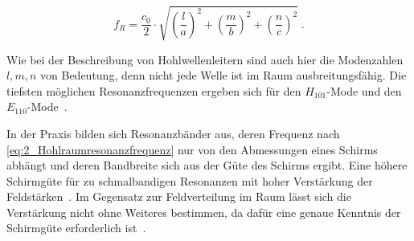 \begin{equation}
    f_R = \frac{c_0}{2}\cdot \sqrt{\left(\frac{l}{a}\right)^2+\left(\frac{m}{b}\right)^2+\left(\frac{n}{c}\right)^2} \; \text{.}
    \label{eq:2_Hohlraumresonanzfrequenz}
\end{equation}


Wie bei der Beschreibung von Hohlwellenleitern sind auch hier die Modenzahlen $l, m, n$ von Bedeutung, denn nicht jede Welle ist im Raum ausbreitungsfähig. Die tiefsten möglichen Resonanzfrequenzen ergeben sich für den $H_{101}$-Mode und den $E_{110}$-Mode~\cite{Klassische_Elektrodynamik, Handbook_Shielding_Materials_and_Performance}. 
\par
\vspace{\linespace}
In der Praxis bilden sich Resonanzbänder aus, deren Frequenz nach \Gleichung\eqref{eq:2_Hohlraumresonanzfrequenz} nur von den Abmessungen eines Schirms abhängt und deren Bandbreite sich aus der Güte des Schirms ergibt. Eine höhere Schirmgüte für zu schmalbandigen Resonanzen mit hoher Verstärkung der Feldstärken~\cite{EM_Schirmung}. Im Gegensatz zur Feldverteilung im Raum lässt sich die Verstärkung nicht ohne Weiteres bestimmen, da dafür eine genaue Kenntnis der Schirmgüte erforderlich ist~\cite{EM_Schirmung}.


